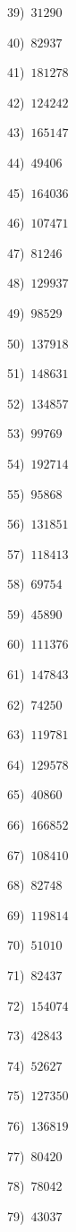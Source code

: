 \documentclass{article}
\begin{document}
\begin{multicols}{2}
39)$\,\,\,31290$ \par 
40)$\,\,\,82937$ \par 
41)$\,\,\,181278$ \par 
42)$\,\,\,124242$ \par 
43)$\,\,\,165147$ \par 
44)$\,\,\,49406$ \par 
45)$\,\,\,164036$ \par 
46)$\,\,\,107471$ \par 
47)$\,\,\,81246$ \par 
48)$\,\,\,129937$ \par 
49)$\,\,\,98529$ \par 
50)$\,\,\,137918$ \par 
51)$\,\,\,148631$ \par 
52)$\,\,\,134857$ \par 
53)$\,\,\,99769$ \par 
54)$\,\,\,192714$ \par 
55)$\,\,\,95868$ \par 
56)$\,\,\,131851$ \par 
57)$\,\,\,118413$ \par 
58)$\,\,\,69754$ \par 
59)$\,\,\,45890$ \par 
60)$\,\,\,111376$ \par 
61)$\,\,\,147843$ \par 
62)$\,\,\,74250$ \par 
63)$\,\,\,119781$ \par 
64)$\,\,\,129578$ \par 
65)$\,\,\,40860$ \par 
66)$\,\,\,166852$ \par 
67)$\,\,\,108410$ \par 
68)$\,\,\,82748$ \par 
69)$\,\,\,119814$ \par 
70)$\,\,\,51010$ \par 
71)$\,\,\,82437$ \par 
72)$\,\,\,154074$ \par 
73)$\,\,\,42843$ \par 
74)$\,\,\,52627$ \par 
75)$\,\,\,127350$ \par 
76)$\,\,\,136819$ \par 
77)$\,\,\,80420$ \par 
78)$\,\,\,78042$ \par 
79)$\,\,\,43037$ \par 

\end{multicols}
\end{document}
